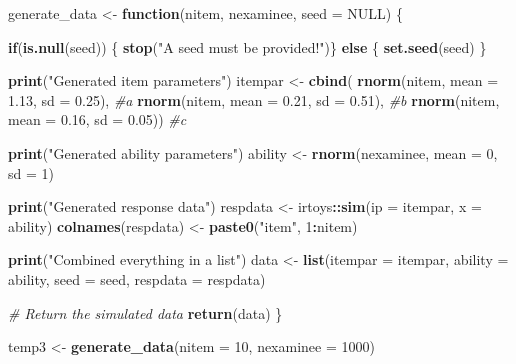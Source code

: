 \documentclass[
]{book}
\newenvironment{Shaded}{\begin{snugshade}}{\end{snugshade}}
\newcommand{\CommentTok}[1]{\textcolor[rgb]{0.56,0.35,0.01}{\textit{#1}}}
\newcommand{\ControlFlowTok}[1]{\textcolor[rgb]{0.13,0.29,0.53}{\textbf{#1}}}
\newcommand{\DataTypeTok}[1]{\textcolor[rgb]{0.13,0.29,0.53}{#1}}
\newcommand{\DecValTok}[1]{\textcolor[rgb]{0.00,0.00,0.81}{#1}}
\newcommand{\FloatTok}[1]{\textcolor[rgb]{0.00,0.00,0.81}{#1}}
\newcommand{\KeywordTok}[1]{\textcolor[rgb]{0.13,0.29,0.53}{\textbf{#1}}}
\newcommand{\NormalTok}[1]{#1}
\newcommand{\OperatorTok}[1]{\textcolor[rgb]{0.81,0.36,0.00}{\textbf{#1}}}
\newcommand{\OtherTok}[1]{\textcolor[rgb]{0.56,0.35,0.01}{#1}}
\newcommand{\StringTok}[1]{\textcolor[rgb]{0.31,0.60,0.02}{#1}}
\begin{document}
\begin{Shaded}
\begin{Highlighting}[]
\NormalTok{generate_data <-}\StringTok{ }\ControlFlowTok{function}\NormalTok{(nitem, nexaminee, }\DataTypeTok{seed =} \OtherTok{NULL}\NormalTok{) \{}
  
  \ControlFlowTok{if}\NormalTok{(}\KeywordTok{is.null}\NormalTok{(seed)) \{}
    \KeywordTok{stop}\NormalTok{(}\StringTok{"A seed must be provided!"}\NormalTok{)\} }
  \ControlFlowTok{else}\NormalTok{ \{}
    \KeywordTok{set.seed}\NormalTok{(seed)}
\NormalTok{  \}}
  
  \KeywordTok{print}\NormalTok{(}\StringTok{"Generated item parameters"}\NormalTok{)}
\NormalTok{  itempar <-}\StringTok{ }\KeywordTok{cbind}\NormalTok{(}
    \KeywordTok{rnorm}\NormalTok{(nitem, }\DataTypeTok{mean =} \FloatTok{1.13}\NormalTok{, }\DataTypeTok{sd =} \FloatTok{0.25}\NormalTok{), }\CommentTok{#a}
    \KeywordTok{rnorm}\NormalTok{(nitem, }\DataTypeTok{mean =} \FloatTok{0.21}\NormalTok{, }\DataTypeTok{sd =} \FloatTok{0.51}\NormalTok{), }\CommentTok{#b}
    \KeywordTok{rnorm}\NormalTok{(nitem, }\DataTypeTok{mean =} \FloatTok{0.16}\NormalTok{, }\DataTypeTok{sd =} \FloatTok{0.05}\NormalTok{)) }\CommentTok{#c}
  
  \KeywordTok{print}\NormalTok{(}\StringTok{"Generated ability parameters"}\NormalTok{)}
\NormalTok{  ability <-}\StringTok{ }\KeywordTok{rnorm}\NormalTok{(nexaminee, }\DataTypeTok{mean =} \DecValTok{0}\NormalTok{, }\DataTypeTok{sd =} \DecValTok{1}\NormalTok{)}
  
  \KeywordTok{print}\NormalTok{(}\StringTok{"Generated response data"}\NormalTok{)}
\NormalTok{  respdata <-}\StringTok{ }\NormalTok{irtoys}\OperatorTok{::}\KeywordTok{sim}\NormalTok{(}\DataTypeTok{ip =}\NormalTok{ itempar, }\DataTypeTok{x =}\NormalTok{ ability)}
  \KeywordTok{colnames}\NormalTok{(respdata) <-}\StringTok{ }\KeywordTok{paste0}\NormalTok{(}\StringTok{"item"}\NormalTok{, }\DecValTok{1}\OperatorTok{:}\NormalTok{nitem)}
  
  \KeywordTok{print}\NormalTok{(}\StringTok{"Combined everything in a list"}\NormalTok{)}
\NormalTok{  data <-}\StringTok{ }\KeywordTok{list}\NormalTok{(}\DataTypeTok{itempar =}\NormalTok{ itempar,}
               \DataTypeTok{ability =}\NormalTok{ ability,}
               \DataTypeTok{seed =}\NormalTok{ seed,}
               \DataTypeTok{respdata =}\NormalTok{ respdata)}
  
  \CommentTok{# Return the simulated data}
  \KeywordTok{return}\NormalTok{(data)}
\NormalTok{\}}

\NormalTok{temp3 <-}\StringTok{ }\KeywordTok{generate_data}\NormalTok{(}\DataTypeTok{nitem =} \DecValTok{10}\NormalTok{, }\DataTypeTok{nexaminee =} \DecValTok{1000}\NormalTok{)}
\end{Highlighting}
\end{Shaded}
\end{document}
